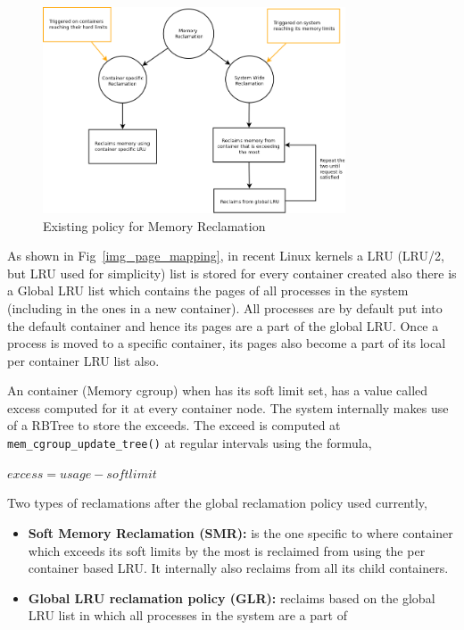       \begin{figure}
	\centering
	\includegraphics[width=0.8\textwidth]{images/background/high_level_Reclamation.png}
	\caption{Existing policy for Memory Reclamation}
	\label{img_high_level}
      \end{figure}  
      
      As shown in Fig~\ref{img_page_mapping}, in recent Linux kernels a LRU (LRU/2, but LRU used for simplicity) list is stored for every 
container created also there is a Global LRU list which contains the pages of all processes in the system (including in the ones in a new 
container). All processes are by default put into the default container and hence its pages are a part of the global LRU.  Once a process is 
moved to a specific container, its pages also become a part of its local per container LRU list also.
    
      An container (Memory cgroup) when has its soft limit set, has a value called excess computed for it at every container node. The 
system internally makes use of a RBTree to store the exceeds. The exceed is computed at \texttt{mem\_cgroup\_update\_tree()} at regular 
intervals using the formula,
      
      \begin{center}
	$ excess = usage - softlimit $
      \end{center}
      
      \pagebreak
      
      \noindent Two types of reclamations after the global reclamation policy used currently, 
      
      \begin{itemize}
       \item \textbf{Soft Memory Reclamation (SMR):} is the one specific to \cg{} where container which exceeds its 
soft limits by the most is reclaimed from using the per container based LRU. It internally also reclaims from all its child containers.  
       \item \textbf{Global LRU reclamation policy (GLR):} reclaims based on the global LRU list in which all processes in the system are a 
part of
      \end{itemize}     
      
